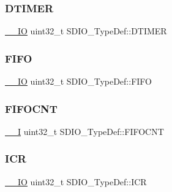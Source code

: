 \mbox{\label{struct_s_d_i_o___type_def_a5af1984c7c00890598ca74fc85449f9f}} 
\subsubsection{\texorpdfstring{DTIMER}{DTIMER}}
{\footnotesize\ttfamily \mbox{\hyperlink{group___c_m_s_i_s___c_m3__core__definitions_gaec43007d9998a0a0e01faede4133d6be}{\+\_\+\+\_\+\+IO}} uint32\+\_\+t S\+D\+I\+O\+\_\+\+Type\+Def\+::\+D\+T\+I\+M\+ER}

\mbox{\label{struct_s_d_i_o___type_def_ab4757027388ea3a0a6f114d7de2ed4cf}} 
\subsubsection{\texorpdfstring{FIFO}{FIFO}}
{\footnotesize\ttfamily \mbox{\hyperlink{group___c_m_s_i_s___c_m3__core__definitions_gaec43007d9998a0a0e01faede4133d6be}{\+\_\+\+\_\+\+IO}} uint32\+\_\+t S\+D\+I\+O\+\_\+\+Type\+Def\+::\+F\+I\+FO}

\mbox{\label{struct_s_d_i_o___type_def_ae30d52b6556f5d17db8e5cfd2641e7b4}} 
\subsubsection{\texorpdfstring{FIFOCNT}{FIFOCNT}}
{\footnotesize\ttfamily \mbox{\hyperlink{group___c_m_s_i_s___c_m3__core__definitions_gaf63697ed9952cc71e1225efe205f6cd3}{\+\_\+\+\_\+I}} uint32\+\_\+t S\+D\+I\+O\+\_\+\+Type\+Def\+::\+F\+I\+F\+O\+C\+NT}

\mbox{\label{struct_s_d_i_o___type_def_ae3c052b85cc438d2b3069f99620e5139}} 
\subsubsection{\texorpdfstring{ICR}{ICR}}
{\footnotesize\ttfamily \mbox{\hyperlink{group___c_m_s_i_s___c_m3__core__definitions_gaec43007d9998a0a0e01faede4133d6be}{\+\_\+\+\_\+\+IO}} uint32\+\_\+t S\+D\+I\+O\+\_\+\+Type\+Def\+::\+I\+CR}


